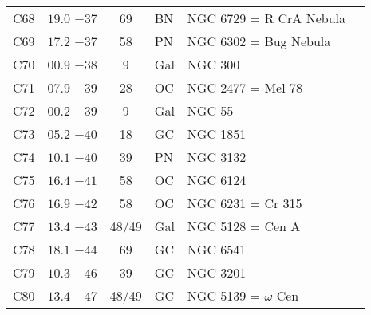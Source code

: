\begin{table}[p]
\begin{tabular}{lcclll}
C68  &$19.0$ $-37$&69&BN &NGC 6729 = R CrA Nebula\\
C69  &$17.2$ $-37$&58&PN &NGC 6302 = Bug Nebula\\
C70  &$00.9$ $-38$&9&Gal&NGC 300\\
C71  &$07.9$ $-39$&28&OC &NGC 2477 = Mel 78\\
C72  &$00.2$ $-39$&9&Gal&NGC 55\\
C73  &$05.2$ $-40$&18&GC &NGC 1851\\
C74  &$10.1$ $-40$&39&PN &NGC 3132\\
C75  &$16.4$ $-41$&58&OC &NGC 6124\\
C76  &$16.9$ $-42$&58&OC &NGC 6231 = Cr 315\\
C77  &$13.4$ $-43$&48/49&Gal&NGC 5128 = Cen A\\
C78  &$18.1$ $-44$&69&GC &NGC 6541\\
C79  &$10.3$ $-46$&39&GC &NGC 3201\\
C80  &$13.4$ $-47$&48/49&GC &NGC 5139 = $\omega$ Cen\\
\hline
\end{tabular}
\end{table}

